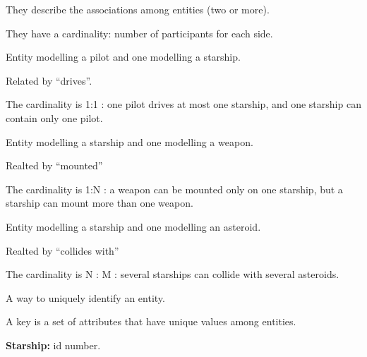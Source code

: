 \documentclass{beamer}
\begin{document}
\begin{slide}{
\item They describe the associations among entities (two or more).
\item They have a cardinality: number of participants for each side.

}\end{slide}

\begin{slide}{
\item Entity modelling a pilot and one modelling a starship.
\item Related by ``drives''.
\item The cardinality is 1:1 : one pilot drives at most one starship, and one starship can contain only one pilot.

}\end{slide}

\begin{slide}{
\item Entity modelling a starship and one modelling a weapon.
\item Realted by ``mounted''
\item The cardinality is 1:N : a weapon can be mounted only on one starship, but a starship can mount more than one weapon.

}\end{slide}

\begin{slide}{
\item Entity modelling a starship and one modelling an asteroid.
\item Realted by ``collides with''
\item The cardinality is N : M : several starships can collide with several asteroids.

}\end{slide}

\begin{slide}{
\item A way to uniquely identify an entity.
\item A key is a set of attributes that have unique values among entities.
\item \textbf{Starship:} id number.

}\end{slide}
\end{document}
